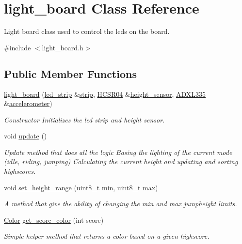 \hypertarget{classlight__board}{}\section{light\+\_\+board Class Reference}
\label{classlight__board}


Light board class used to control the leds on the board.  




{\ttfamily \#include $<$light\+\_\+board.\+h$>$}

\subsection*{Public Member Functions}
\begin{DoxyCompactItemize}
\item 
\hyperlink{classlight__board_afe44f3bfa122191bb9c2ee0022c0ad2f}{light\+\_\+board} (\hyperlink{classled__strip}{led\+\_\+strip} \&\hyperlink{classlight__board_a350253c03ce43fa63581e2fabae71ff4}{strip}, \hyperlink{classHCSR04}{H\+C\+S\+R04} \&\hyperlink{classlight__board_a1cfdc254b89c950cf3f6216518c19e92}{height\+\_\+sensor}, \hyperlink{classADXL335}{A\+D\+X\+L335} \&\hyperlink{classlight__board_a8bff254fba1927ad510f18a6a8239b57}{accelerometer})
\begin{DoxyCompactList}\small\item\em Constructor Initializes the led strip and height sensor. \end{DoxyCompactList}\item 
void \hyperlink{classlight__board_a144e77559c4ec9f266e887b7d00ad3b8}{update} ()\hypertarget{classlight__board_a144e77559c4ec9f266e887b7d00ad3b8}{}\label{classlight__board_a144e77559c4ec9f266e887b7d00ad3b8}

\begin{DoxyCompactList}\small\item\em Update method that does all the logic Basing the lighting of the current mode (idle, riding, jumping) Calculating the current height and updating and sorting highscores. \end{DoxyCompactList}\item 
void \hyperlink{classlight__board_a292792403615dc215ca5c8d9ead57550}{set\+\_\+height\+\_\+range} (uint8\+\_\+t min, uint8\+\_\+t max)
\begin{DoxyCompactList}\small\item\em A method that give the ability of changing the min and max jumpheight limits. \end{DoxyCompactList}\item 
\hyperlink{classColor}{Color} \hyperlink{classlight__board_ad143c0de4a0e9d5fa73fcdef30035d79}{get\+\_\+score\+\_\+color} (int score)
\begin{DoxyCompactList}\small\item\em Simple helper method that returns a color based on a given highscore. \end{DoxyCompactList}\end{DoxyCompactItemize}
